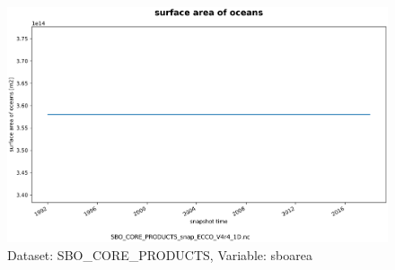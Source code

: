 \begin{figure}[H]
\centering
\includegraphics[scale=0.55]{../images/plots/oneD_plots/SBO_Core_Products/sboarea.png}
\caption{Dataset: SBO\_CORE\_PRODUCTS, Variable: sboarea}
\label{tab:table-SBO_CORE_PRODUCTS_sboarea-Plot}
\end{figure}
\pagebreak
